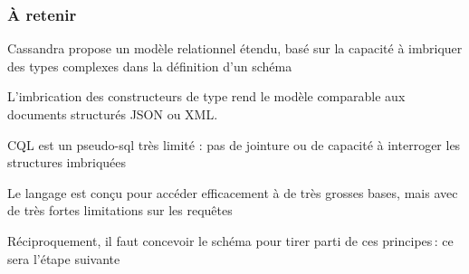 \begin{frame}[fragile]
\frametitle{À retenir}

\begin{redbullet}
   \item Cassandra propose un modèle relationnel étendu, basé sur la capacité à imbriquer
     des types complexes dans la définition d'un schéma
   \item L'imbrication des constructeurs de type
   rend le modèle comparable aux documents structurés JSON ou XML.
   \item CQL est un pseudo-sql très limité : pas de jointure ou de capacité
       à interroger les structures imbriquées
   \item Le langage est conçu  pour accéder \alert{efficacement} à de très grosses
      bases, mais avec de très fortes limitations sur les requêtes
   \item Réciproquement, il faut concevoir le schéma pour tirer parti
   de ces principes\,: ce sera l'étape suivante
\end{redbullet}

\end{frame}
